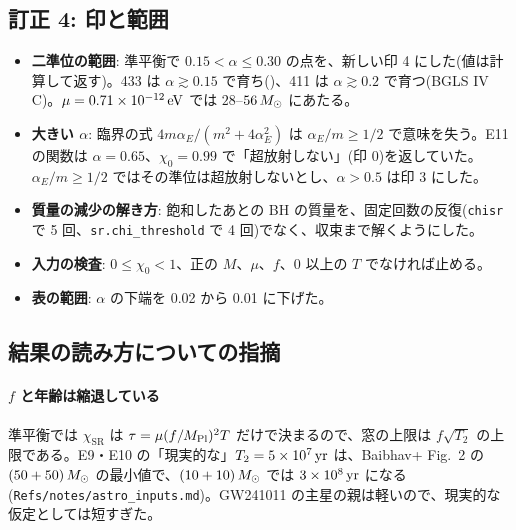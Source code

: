 \subsection{訂正 4: 印と範囲}

\begin{itemize}
\item \textbf{二準位の範囲}: 準平衡で $0.15<\alpha\le0.30$ の点を、新しい印 4 にした(値は計算して返す)。433 は $\alpha\gtrsim0.15$ で育ち()、411 は $\alpha\gtrsim0.2$ で育つ(BGLS IV C)。$\mu=0.71\times10^{-12}\,\mathrm{eV}$ では $28$--$56\,M_\odot$ にあたる。
\item \textbf{大きい $\alpha$}: 臨界の式 $4m\alpha_E/(m^2+4\alpha_E^2)$ は $\alpha_E/m\ge1/2$ で意味を失う。E11 の関数は $\alpha=0.65$、$\chi_0=0.99$ で「超放射しない」(印 0)を返していた。$\alpha_E/m\ge1/2$ ではその準位は超放射しないとし、$\alpha>0.5$ は印 3 にした。
\item \textbf{質量の減少の解き方}: 飽和したあとの BH の質量を、固定回数の反復(\texttt{chisr} で 5 回、\texttt{sr.chi\_threshold} で 4 回)でなく、収束まで解くようにした。
\item \textbf{入力の検査}: $0\le\chi_0<1$、正の $M$、$\mu$、$f$、0 以上の $T$ でなければ止める。
\item \textbf{表の範囲}: $\alpha$ の下端を 0.02 から 0.01 に下げた。
\end{itemize}

\subsection{結果の読み方についての指摘}

\paragraph{$f$ と年齢は縮退している}
準平衡では $\chi_\mathrm{SR}$ は $\tau=\mu(f/M_\mathrm{Pl})^2T$ だけで決まるので、窓の上限は $f\sqrt{T_2}$ の上限である。E9・E10 の「現実的な」$T_2=5\times10^7\,\mathrm{yr}$ は、Baibhav+  Fig.~2 の $(50+50)\,M_\odot$ の最小値で、$(10+10)\,M_\odot$ では $3\times10^8\,\mathrm{yr}$ になる(\texttt{Refs/notes/astro\_inputs.md})。GW241011 の主星の親は軽いので、現実的な仮定としては短すぎた。

